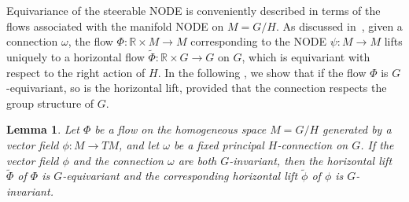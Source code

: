 \documentclass[12pt,a4paper]{article}
\numberwithin{equation}{section}
\newcommand{\R}{\mathbb{R}}
\theoremstyle{plain}
\newtheorem{lemma}[theorem]{Lemma}
\theoremstyle{definition}
\theoremstyle{remark}
\begin{document}
Equivariance of the steerable NODE is conveniently described in terms of the flows associated with the manifold NODE on $M=G/H$. As discussed in~, given a connection $\omega$, the flow $\Phi:\R \times M \to M$ corresponding to the NODE $\psi:M \to M$ lifts uniquely to a horizontal flow $\tilde{\Phi}: \R \times G \to G$ on $G$, which is equivariant with respect to the right action of $H$. In the following , we show that if the flow $\Phi$ is $G$-equivariant, so is the horizontal lift, provided that the connection respects the group structure of $G$.  

\begin{lemma}\label{lem:equiv_lift}
    Let $\Phi$ be a flow on the homogeneous space $M=G/H$ generated by a vector field $\phi: M \to TM$, and let $\omega$ be a fixed principal $H$-connection on $G$. If the vector field $\phi$ and the connection $\omega$ are both $G$-invariant, then the horizontal lift $\tilde{\Phi}$ of $\Phi$ is $G$-equivariant and the corresponding horizontal lift $\tilde{\phi}$ of $\phi$ is $G$-invariant.
\end{lemma}
\end{document}
